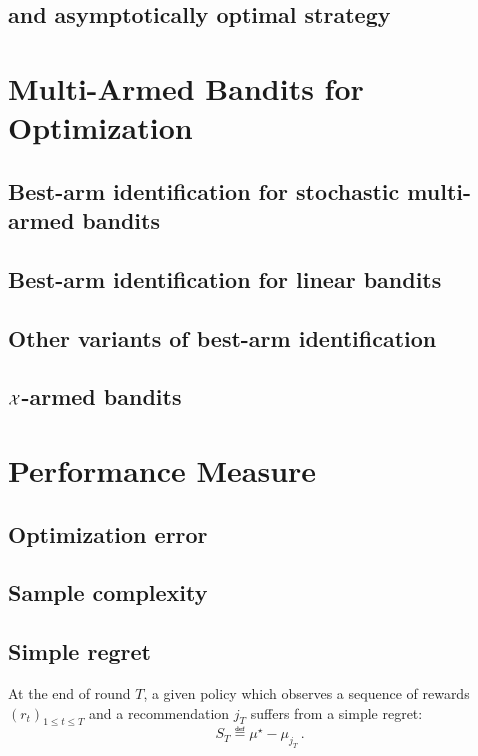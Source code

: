 \subsection{\UCB{} and asymptotically optimal strategy}\label{sec:mab.model.ucb}

\section{Multi-Armed Bandits for Optimization}\label{sec:mab.optim}

\subsection{Best-arm identification for stochastic multi-armed bandits}

\subsection{Best-arm identification for linear bandits}

\subsection{Other variants of best-arm identification}

\subsection{$\mathcal{X}$-armed bandits}

\section{Performance Measure}\label{sec:mab.performance}

\subsection{Optimization error}

\subsection{Sample complexity}

\subsection{Simple regret}

\begin{definition}\label{def:stoch_mab.simple_regret}
\begin{leftbar}[defnbar]
	At the end of round $T$, a given policy which observes a sequence of rewards $(r_t)_{1 \leq t \leq T}$ and a recommendation $j_T$ suffers from a simple regret:
	\[
		S_T \eqdef \mu^{\star} - \mu_{j_T}\,.
	\]
\end{leftbar}
\end{definition}